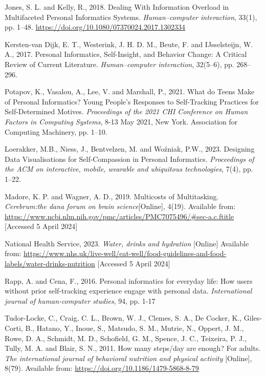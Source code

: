 \documentclass[12pt]{article}
\begin{document}
\renewcommand{\refname}{} 
\vspace{-20pt}
\begin{thebibliography}{99}
    Jones, S. L. and Kelly, R., 2018. 
    Dealing With Information Overload in Multifaceted Personal Informatics Systems. 
    \textit{Human–computer interaction}, 33(1), pp. 1–48. \url{https://doi.org/10.1080/07370024.2017.1302334}

    Kersten-van Dijk, E. T., Westerink, J. H. D. M., Beute, F. and 
    IJsselsteijn, W. A., 2017. 
    Personal Informatics, Self-Insight, and Behavior Change: A Critical Review of Current Literature. 
    \textit{Human–computer interaction}, 32(5–6), pp. 268–296.

    Potapov, K., Vasalou, A., Lee, V. and Marshall, P., 2021. 
    What do Teens Make of Personal Informatics? 
    Young People's Responses to Self-Tracking Practices for Self-Determined Motives. 
    \textit{Proceedings of the 2021 CHI Conference on Human Factors in Computing Systems}, 
    8-13 May 2021, New York. Association for Computing Machinery, pp. 1–10.

    Loerakker, M.B., Niess, J., Bentvelzen, M. and Woźniak, P.W., 2023. 
    Designing Data Visualisations for Self-Compassion in Personal Informatics. 
    \textit{Proceedings of the ACM on interactive, mobile, wearable and ubiquitous technologies}, 7(4), pp. 1–22.

    Madore, K. P. and Wagner, A. D., 2019. Multicosts of Multitasking. 
    \textit{Cerebrum:the dana forum on brain science}[Online], 4(19). Available from:
    \url{https://www.ncbi.nlm.nih.gov/pmc/articles/PMC7075496/#sec-a.c.ftitle} 
    [Accessed 5 April 2024]

    National Health Service, 2023. \textit{Water, drinks and hydration} [Online] 
    Available from: 
    \url{https://www.nhs.uk/live-well/eat-well/food-guidelines-and-food-labels/water-drinks-nutrition} 
    [Accessed 5 April 2024]
    
    Rapp, A. and Cena, F., 2016. Personal informatics for everyday life: 
    How users without prior self-tracking experience engage with personal data. 
    \textit{International journal of human-computer studies}, 94, pp. 1-17

    Tudor-Locke, C., Craig, C. L., Brown, W. J., Clemes, S. A., De Cocker, K., 
    Giles-Corti, B., Hatano, Y., Inoue, S., Matsudo, S. M., Mutrie, N., Oppert, J. M., Rowe, D. A., 
    Schmidt, M. D., Schofield, G. M., Spence, J. C., Teixeira, P. J., Tully, M. A. and Blair, S. N., 2011. 
    How many steps/day are enough? For adults. 
    \textit{The international journal of behavioral nutrition and physical activity} 
    [Online], 8(79). Available from: \url{https://doi.org/10.1186/1479-5868-8-79}


\end{thebibliography}
\end{document}
